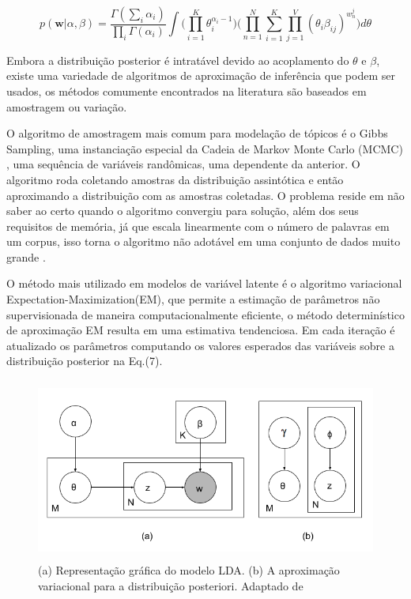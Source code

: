 \documentclass[12pt,a4paper]{article}
\begin{document}
  \begin{equation}
  p(\textbf{w}|\alpha,\beta)=\frac{\Gamma(\sum_{i}\alpha_i)}{\prod_{i}\Gamma(\alpha_i)}\int{\Bigg(\prod_{i=1}^{K}\theta_i^{\alpha_i-1}\Bigg)} \Bigg(\prod_{n=1}^{N}\sum_{i=1}^{K}\prod_{j=1}^{V}(\theta_i\beta_{ij})^{w_n^j}\Bigg)d\theta
  \end{equation}
  
  Embora a distribuição posterior é intratável devido ao acoplamento do $\theta$ e $\beta$, existe uma variedade de algoritmos de aproximação de inferência que podem ser usados,
   os métodos comumente encontrados na literatura são baseados em amostragem ou variação.
  
  O algoritmo de amostragem mais comum para modelação de tópicos é o Gibbs Sampling, uma instanciação especial da Cadeia de Markov Monte Carlo (MCMC) \cite{jordan1999introduction},
   uma sequência de variáveis randômicas, uma dependente da anterior. O algoritmo roda coletando amostras da distribuição assintótica e então aproximando a distribuição com as amostras coletadas.
   O problema reside em não saber ao certo  quando o algoritmo convergiu para solução, além dos seus requisitos de memória, já que escala linearmente com o número de palavras em um corpus,
   isso torna o algoritmo não adotável em uma conjunto de dados muito grande \cite{vrehuuvrek2011scalability}.
  
  O método mais utilizado em modelos de variável latente é o algoritmo variacional Expectation-Maximization(EM), que permite a estimação de parâmetros não supervisionada de maneira computacionalmente eficiente,
   o método determinístico de aproximação EM resulta em uma estimativa tendenciosa. Em cada iteração é atualizado os parâmetros computando os valores esperados das variáveis sobre a distribuição posterior na Eq.(7).
  
  
  \begin{figure}[H]
    \centering
      \includegraphics[height=6cm]{images/figure_2.png}
      \caption{(a) Representação gráfica do modelo LDA. (b) A aproximação variacional para a distribuição posteriori. Adaptado de }
  \end{figure}
  
\end{document}
